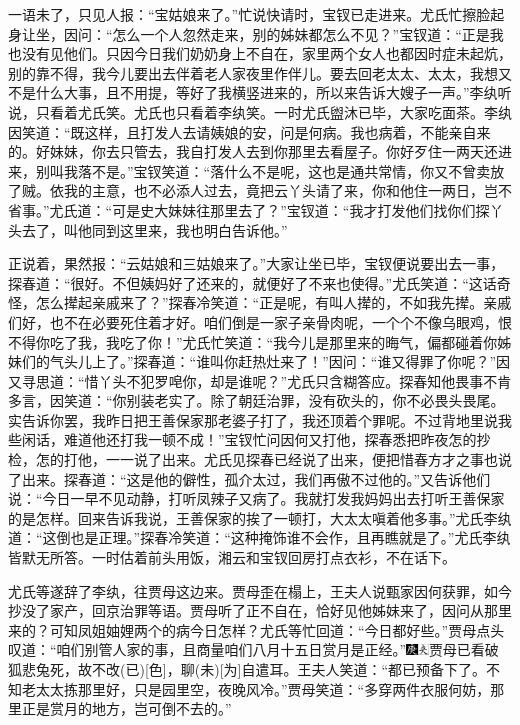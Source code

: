 一语未了，只见人报：``宝姑娘来了。''忙说快请时，宝钗已走进来。尤氏忙擦脸起身让坐，因问：``怎么一个人忽然走来，别的姊妹都怎么不见？''宝钗道：``正是我也没有见他们。只因今日我们奶奶身上不自在，家里两个女人也都因时症未起炕，别的靠不得，我今儿要出去伴着老人家夜里作伴儿。要去回老太太、太太，我想又不是什么大事，且不用提，等好了我横竖进来的，所以来告诉大嫂子一声。''李纨听说，只看着尤氏笑。尤氏也只看着李纨笑。一时尤氏盥沐已毕，大家吃面茶。李纨因笑道：``既这样，且打发人去请姨娘的安，问是何病。我也病着，不能亲自来的。好妹妹，你去只管去，我自打发人去到你那里去看屋子。你好歹住一两天还进来，别叫我落不是。''宝钗笑道：``落什么不是呢，这也是通共常情，你又不曾卖放了贼。依我的主意，也不必添人过去，竟把云丫头请了来，你和他住一两日，岂不省事。''尤氏道：``可是史大妹妹往那里去了？''宝钗道：``我才打发他们找你们探丫头去了，叫他同到这里来，我也明白告诉他。''

正说着，果然报：``云姑娘和三姑娘来了。''大家让坐已毕，宝钗便说要出去一事，探春道：``很好。不但姨妈好了还来的，就便好了不来也使得。''尤氏笑道：``这话奇怪，怎么撵起亲戚来了？''探春冷笑道：``正是呢，有叫人撵的，不如我先撵。亲戚们好，也不在必要死住着才好。咱们倒是一家子亲骨肉呢，一个个不像乌眼鸡，恨不得你吃了我，我吃了你！''尤氏忙笑道：``我今儿是那里来的晦气，偏都碰着你姊妹们的气头儿上了。''探春道：``谁叫你赶热灶来了！''因问：``谁又得罪了你呢？''因又寻思道：``惜丫头不犯罗唣你，却是谁呢？''尤氏只含糊答应。探春知他畏事不肯多言，因笑道：``你别装老实了。除了朝廷治罪，没有砍头的，你不必畏头畏尾。实告诉你罢，我昨日把王善保家那老婆子打了，我还顶着个罪呢。不过背地里说我些闲话，难道他还打我一顿不成！''宝钗忙问因何又打他，探春悉把昨夜怎的抄检，怎的打他，一一说了出来。尤氏见探春已经说了出来，便把惜春方才之事也说了出来。探春道：``这是他的僻性，孤介太过，我们再傲不过他的。''又告诉他们说：``今日一早不见动静，打听凤辣子又病了。我就打发我妈妈出去打听王善保家的是怎样。回来告诉我说，王善保家的挨了一顿打，大太太嗔着他多事。''尤氏李纨道：``这倒也是正理。''探春冷笑道：``这种掩饰谁不会作，且再瞧就是了。''尤氏李纨皆默无所答。一时估着前头用饭，湘云和宝钗回房打点衣衫，不在话下。

尤氏等遂辞了李纨，往贾母这边来。贾母歪在榻上，王夫人说甄家因何获罪，如今抄没了家产，回京治罪等语。贾母听了正不自在，恰好见他姊妹来了，因问从那里来的？可知凤姐妯娌两个的病今日怎样？尤氏等忙回道：``今日都好些。''贾母点头叹道：``咱们别管人家的事，且商量咱们八月十五日赏月是正经。''{\includegraphics[width=3mm]{../Images/00004}\includegraphics[width=3mm]{../Images/00012}\footnotesize \kaishu 贾母已看破狐悲兔死，故不改{(已)}{[}色{]}，聊{(未)}{[}为{]}自遣耳。}王夫人笑道：``都已预备下了。不知老太太拣那里好，只是园里空，夜晚风冷。''贾母笑道：``多穿两件衣服何妨，那里正是赏月的地方，岂可倒不去的。''

